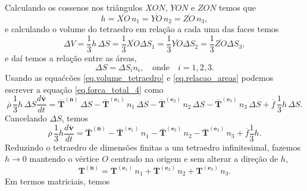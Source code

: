 Calculando os cossenos nos tri\^angulos $XON$, $YON$ e $ZON$ temos que
\begin{equation*}
h=\overline{XO}\,n_1=\overline{YO}\,n_2=\overline{ZO}\,n_3,
\end{equation*}
e calculando o volume do tetraedro em rela\c{c}\~ao a cada uma das faces temos
\begin{equation}\label{eq.volume_tetraedro}
\Delta V=\frac{1}{3}h\,\Delta S=\frac{1}{3}\overline{XO}\Delta S_1=\frac{1}{3}\overline{YO}\Delta S_2=\frac{1}{3}\overline{ZO}\Delta S_3,
\end{equation}
e da\'i temos a rela\c{c}\~ao entre as \'areas,
\begin{equation}\label{eq.relacao_areas}
\Delta S=\Delta S_in_i,\quad\text{onde}\quad i=1,2,3.
\end{equation}
Usando as equa\'c{c}\~oes \ref{eq.volume_tetraedro} e \ref{eq.relacao_areas} podemos escrever a equa\c{c}\~ao \ref{eq.forca_total_4} como
\begin{equation*}
\overline{\rho}\,\frac{1}{3}h\,\Delta S\frac{d\overline{\mathbf{v}}}{dt}=\mathbf{\overline{T}}^{(\mathbf{n})}\,\Delta S-\mathbf{\overline{T}}^{(\mathbf{e}_1)}\,n_1\,\Delta S-\mathbf{\overline{T}}^{(\mathbf{e}_2)}\,n_2\,\Delta S-\mathbf{\overline{T}}^{(\mathbf{e}_3)}\,n_3\,\Delta S+\overline{f}\,\frac{1}{3}h\,\Delta S.
\end{equation*}
Cancelando $\Delta S$, temos
\begin{equation*}
\overline{\rho}\,\frac{1}{3}h\frac{d\overline{\mathbf{v}}}{dt}=\mathbf{\overline{T}}^{(\mathbf{n})}-\mathbf{\overline{T}}^{(\mathbf{e}_1)}\,n_1-\mathbf{\overline{T}}^{(\mathbf{e}_2)}\,n_2-\mathbf{\overline{T}}^{(\mathbf{e}_3)}\,n_3+\overline{f}\frac{1}{3}h.
\end{equation*}
Reduzindo o tetraedro de dimens\~oes finitas a um tetraedro infinitesimal, fazemos $h\to 0$ mantendo o v\'ertice $O$ centrado na origem e sem alterar a dire\c{c}\~ao de $h$,
\begin{equation*}
\mathbf{T}^{(\mathbf{n})}=\mathbf{T}^{(\mathbf{e}_1)}\,n_1+\mathbf{T}^{(\mathbf{e}_2)}\,n_2+\mathbf{T}^{(\mathbf{e}_3)}\,n_3.
\end{equation*}
Em termos matriciais, temos
